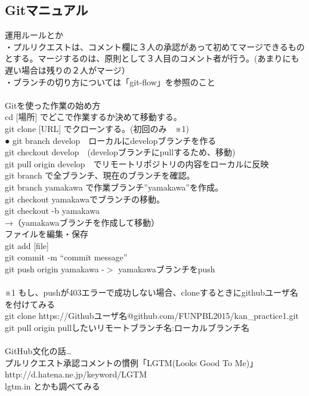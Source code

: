 \documentclass[openany,11pt,papersize]{jsbook}
\begin{document}
\begin{appendix}
\section{Gitマニュアル}
運用ルールとか \\
・プルリクエストは、コメント欄に３人の承認があって初めてマージできるものとする。マージするのは、原則として３人目のコメント者が行う。(あまりにも遅い場合は残りの２人がマージ）\\
・ブランチの切り方については「git-flow」を参照のこと \\ \\
Gitを使った作業の始め方 \\
cd [場所] でどこで作業するか決めて移動する。 \\
git clone [URL] でクローンする。(初回のみ　※1) \\
      ● git branch develop　ローカルにdevelopブランチを作る \\
git checkout develop　(developブランチにpullするため、移動) \\
git pull origin develop　でリモートリポジトリの内容をローカルに反映 \\
git branch で全ブランチ、現在のブランチを確認。 \\
git branch yamakawa で作業ブランチ”yamakawa”を作成。 \\
git checkout yamakawaでブランチの移動。 \\
	git checkout -b yamakawa \\
→（yamakawaブランチを作成して移動）\\
 ファイルを編集・保存 \\
git add [file] \\
git commit -m “commit message” \\
git push origin yamakawa  -$>$  yamakawaブランチをpush \\ \\
※1
もし、pushが403エラーで成功しない場合、cloneするときにgithubユーザ名を付けてみる \\
git clone https://Githubユーザ名@github.com/FUNPBL2015/kan\_practice1.git \\
git pull origin pullしたいリモートブランチ名:ローカルブランチ名 \\ \\
GitHub文化の話… \\
プルリクエスト承認コメントの慣例「LGTM(Looks Good To Me)」 \\
http://d.hatena.ne.jp/keyword/LGTM \\
lgtm.in とかも調べてみる \\ \\

\end{appendix}
\end{document}
